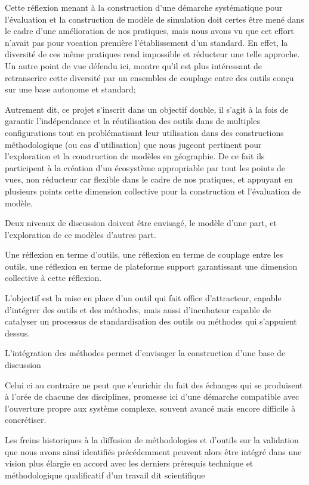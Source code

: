 {Cette réflexion menant à la construction d'une démarche systématique pour l'évaluation et la construction de modèle de simulation doit certes être mené dans le cadre d'une amélioration de nos pratiques, mais nous avons vu que cet effort n'avait pas pour vocation première l'établissement d'un standard. En effet, la diversité de ces même pratiques rend impossible et réducteur une telle approche. 
Un autre point de vue défendu ici, montre qu'il est plus intéressant de retranscrire cette diversité par un ensembles de couplage entre des outils conçu sur une base autonome et standard;

Autrement dit, ce projet s'inscrit dans un objectif double, il s'agit à la fois de garantir l'indépendance et la réutilisation des outils dans de multiples configurations tout en problématisant leur utilisation dans des constructions méthodologique (ou cas d'utilisation) que nous jugeont pertinent pour l'exploration et la construction de modèles en géographie. De ce fait ils participent à la création d'un écosystème appropriable par tout les points de vues, non réducteur car flexible dans le cadre de nos pratiques, et appuyant en plusieurs points cette dimension collective pour la construction et l'évaluation de modèle.

Deux niveaux de discussion doivent être envisagé, le modèle d'une part, et l'exploration de ce modèles d'autres part.

Une réflexion en terme d'outils, une réflexion en terme de couplage entre les outils, une réflexion en terme de plateforme support garantissant une dimension collective à cette réflexion.

L'objectif est la mise en place d'un outil qui fait office d'attracteur,  capable d'intégrer des outils et des méthodes, mais aussi d'incubateur capable de catalyser un processus de standardisation des outils ou méthodes qui s'appuient dessus. 

L'intégration des méthodes permet d'envisager la construction d'une base de discussion

Celui ci au contraire ne peut que s'enrichir du fait des échanges qui se produisent à l'orée de chacune des disciplines, promesse ici d'une démarche compatible avec l'ouverture propre aux système complexe, souvent avancé mais encore difficile à concrétiser.
 
Les freins historiques à la diffusion de méthodologies et d'outils sur la validation que nous avons ainsi identifiés précédemment peuvent alors être intégré dans une vision plus élargie en accord avec les derniers prérequis technique et méthodologique qualificatif d'un travail dit scientifique

}
